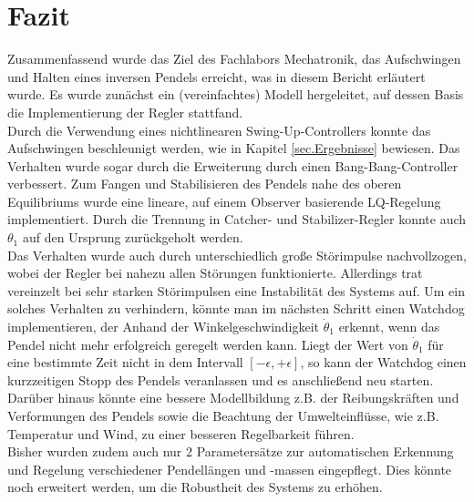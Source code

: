 \section{Fazit}
Zusammenfassend wurde das Ziel des Fachlabors Mechatronik, das Aufschwingen und Halten eines inversen Pendels erreicht, was in diesem Bericht erläutert wurde. Es wurde zunächst ein (vereinfachtes) Modell hergeleitet, auf dessen Basis die Implementierung der Regler stattfand.\\

Durch die Verwendung eines nichtlinearen Swing-Up-Controllers konnte das Aufschwingen beschleunigt werden, wie in Kapitel \ref{sec.Ergebnisse} bewiesen. Das Verhalten wurde sogar durch die Erweiterung durch einen Bang-Bang-Controller verbessert. Zum Fangen und Stabilisieren des Pendels nahe des oberen Equilibriums wurde eine lineare, auf einem Observer basierende LQ-Regelung implementiert. Durch die Trennung in Catcher- und Stabilizer-Regler konnte auch $\theta_1$ auf den Ursprung zurückgeholt werden.\\
Das Verhalten wurde auch durch unterschiedlich große Störimpulse nachvollzogen, wobei der Regler bei nahezu allen Störungen funktionierte. Allerdings trat vereinzelt bei sehr starken Störimpulsen eine Instabilität des Systems auf. Um ein solches Verhalten zu verhindern, könnte man im nächsten Schritt einen Watchdog implementieren, der Anhand der Winkelgeschwindigkeit $\dot{\theta}_1$ erkennt, wenn das Pendel nicht mehr erfolgreich geregelt werden kann. Liegt der Wert von $\dot{\theta}_1$ für eine bestimmte Zeit nicht in dem Intervall $[-\epsilon,+\epsilon]$, so kann der Watchdog einen kurzzeitigen Stopp des Pendels veranlassen und es anschließend neu starten.\\

Darüber hinaus könnte eine bessere Modellbildung z.B. der Reibungskräften und Verformungen des Pendels sowie die Beachtung der Umwelteinflüsse, wie z.B. Temperatur und Wind, zu einer besseren Regelbarkeit führen. \\

Bisher wurden zudem auch nur 2 Parametersätze zur automatischen Erkennung und Regelung verschiedener Pendellängen und -massen eingepflegt. Dies könnte noch erweitert werden, um die Robustheit des Systems zu erhöhen. 
